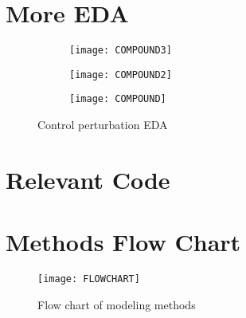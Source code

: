 \documentclass[11.5pt]{article}
\begin{document}
\begin{appendices}

\section{More EDA}

\label{appendix:a}

\begin{figure}[htb]
\begin{subfigure}[b]{0.33\textwidth}
  \texttt{[image: COMPOUND3]}
  \label{fig:c3}
  \end{subfigure}
  \begin{subfigure}[b]{0.33\textwidth}
  \texttt{[image: COMPOUND2]}
  \label{fig:c2}
  \end{subfigure}  
 \begin{subfigure}[b]{0.33\textwidth}
  \texttt{[image: COMPOUND]}
  \label{fig:c}
  \end{subfigure}
\caption{Control perturbation EDA}\label{fig:cpdd}
\end{figure}


\section{Relevant Code}




\section{Methods Flow Chart}

\label{appendix:flow}

\begin{figure}[htb]
  \centering
    \texttt{[image: FLOWCHART]}
  \caption{Flow chart of modeling methods}
\end{figure}

\end{appendices}
\end{document}

